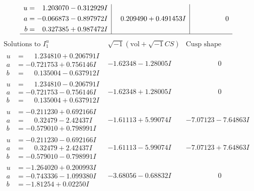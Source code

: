 \documentclass[1p]{elsarticle_modified}
\theoremstyle{definition}
\newcommand{\I}{\sqrt{-1}}
\begin{document}
$$\begin{array}{c|c|c}
\begin{aligned}
u &= \phantom{-}1.203070 - 0.312929 I \\
a &= -0.066873 - 0.897972 I \\
b &= \phantom{-}0.327385 + 0.987472 I\end{aligned}
 & \phantom{-}0.209490 + 0.491453 I & \phantom{-0.000000 } 0\\
 \hline 
 \end{array}$$\newpage$$\begin{array}{c|c|c}  
\text{Solutions to }I^u_{1}& \I (\text{vol} + \sqrt{-1}CS) & \text{Cusp shape}\\
 \hline 
\begin{aligned}
u &= \phantom{-}1.234810 + 0.206791 I \\
a &= -0.721753 + 0.756146 I \\
b &= \phantom{-}0.135004 - 0.637912 I\end{aligned}
 & -1.62348 - 1.28005 I & \phantom{-0.000000 } 0 \\ \hline\begin{aligned}
u &= \phantom{-}1.234810 - 0.206791 I \\
a &= -0.721753 - 0.756146 I \\
b &= \phantom{-}0.135004 + 0.637912 I\end{aligned}
 & -1.62348 + 1.28005 I & \phantom{-0.000000 } 0 \\ \hline\begin{aligned}
u &= -0.211230 + 0.692166 I \\
a &= \phantom{-}0.32479 - 2.42437 I \\
b &= -0.579010 + 0.798991 I\end{aligned}
 & -1.61113 + 5.99074 I & -7.07123 - 7.64863 I \\ \hline\begin{aligned}
u &= -0.211230 - 0.692166 I \\
a &= \phantom{-}0.32479 + 2.42437 I \\
b &= -0.579010 - 0.798991 I\end{aligned}
 & -1.61113 - 5.99074 I & -7.07123 + 7.64863 I \\ \hline\begin{aligned}
u &= -1.264020 + 0.200993 I \\
a &= -0.743336 - 1.099380 I \\
b &= -1.81254 + 0.02250 I\end{aligned}
 & -3.68056 - 0.68832 I & \phantom{-0.000000 } 0 \\ \hline\begin{aligned}

\end{aligned}
\end{array}$$
\end{document}
